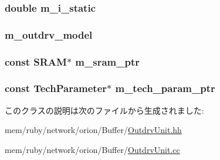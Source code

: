 \label{classOutdrvUnit_a402c958b93bf2d08049bbde4b01ceb53}
\hypertarget{classOutdrvUnit_a16f0c9e5942378eab4d83da3c61aba7f}{
\subsubsection[{m\_\-i\_\-static}]{\setlength{\rightskip}{0pt plus 5cm}double {\bf m\_\-i\_\-static}}}
\label{classOutdrvUnit_a16f0c9e5942378eab4d83da3c61aba7f}
\hypertarget{classOutdrvUnit_a4409528e1df87c5de3763a3b45334500}{
\subsubsection[{m\_\-outdrv\_\-model}]{ {\bf m\_\-outdrv\_\-model}}}
\label{classOutdrvUnit_a4409528e1df87c5de3763a3b45334500}
\hypertarget{classOutdrvUnit_aab5dce4213ab482c5e1909bfc96d62af}{
\subsubsection[{m\_\-sram\_\-ptr}]{\setlength{\rightskip}{0pt plus 5cm}const {\bf SRAM}$\ast$ {\bf m\_\-sram\_\-ptr}}}
\label{classOutdrvUnit_aab5dce4213ab482c5e1909bfc96d62af}
\hypertarget{classOutdrvUnit_a11d1644aa2bfe0e16783dface6fadf13}{
\subsubsection[{m\_\-tech\_\-param\_\-ptr}]{\setlength{\rightskip}{0pt plus 5cm}const {\bf TechParameter}$\ast$ {\bf m\_\-tech\_\-param\_\-ptr}}}
\label{classOutdrvUnit_a11d1644aa2bfe0e16783dface6fadf13}


このクラスの説明は次のファイルから生成されました:\begin{DoxyCompactItemize}
\item 
mem/ruby/network/orion/Buffer/\hyperlink{OutdrvUnit_8hh}{OutdrvUnit.hh}\item 
mem/ruby/network/orion/Buffer/\hyperlink{OutdrvUnit_8cc}{OutdrvUnit.cc}\end{DoxyCompactItemize}
